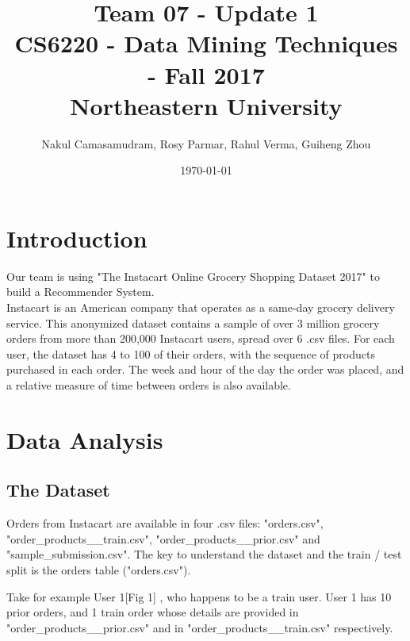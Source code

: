\documentclass[12pt]{article}
\begin{document}

\title{Team 07 - Update 1 \\
	   \large CS6220 - Data Mining Techniques - Fall 2017 \\
	   \large Northeastern University}
\author{Nakul Camasamudram, Rosy Parmar, Rahul Verma, Guiheng Zhou}
\date{\today}



\maketitle

\section{Introduction}
Our team is using "The Instacart Online Grocery Shopping Dataset 2017" to build a Recommender System. \\ 
Instacart is an American company that operates as a same-day grocery delivery service. This anonymized dataset contains a sample of over 3 million grocery orders from more than 200,000 Instacart users, spread over 6 .csv files. For each user, the dataset has 4 to 100 of their orders, with the sequence of products purchased in each order. The week and hour of the day the order was placed, and a relative measure of time between orders is also available.

\section{Data Analysis}

\subsection{The Dataset}

Orders from Instacart are available in four .csv files: "orders.csv", "order\_products\_\_train.csv", "order\_products\_\_prior.csv" and "sample\_submission.csv". The key to understand the dataset and the train / test split is the orders table ("orders.csv").

Take for example User 1[Fig 1] , who happens to be a train user. User 1 has 10 prior orders, and 1 train order whose details are provided in "order\_products\_\_prior.csv" and in "order\_products\_\_train.csv" respectively.
\end{document}
